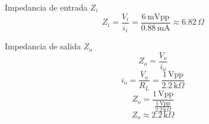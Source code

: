\begin{frame}{}

\begin{block}{Impedancia de entrada $Z_i$}
\[
Z_i = \frac{V_i}{i_i} = \frac{6\,\text{mVpp}}{0.88\,\text{mA}} \approx 6.82\,\Omega
\]
\end{block}

\begin{block}{Impedancia de salida $Z_o$}
\[
Z_o = \frac{V_o}{i_o}
\]
\[
i_o = \frac{V_o}{R_L} = \frac{1\,\text{Vpp}}{2.2\,\text{k}\Omega}
\]
\[
Z_o = \frac{1\,\text{Vpp}}{\tfrac{1\,\text{Vpp}}{2.2\,\text{k}\Omega}}
\]
\[
Z_o \approx 2.2\,\text{k}\Omega
\]
\end{block}

\end{frame}

